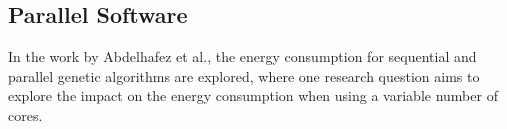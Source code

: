 \subsection{Parallel Software}

In the work by Abdelhafez et al.\cite{abdelhafez2019}, the energy consumption for sequential and parallel genetic algorithms are explored, where one research question aims to explore the impact on the energy consumption when using a variable number of cores.